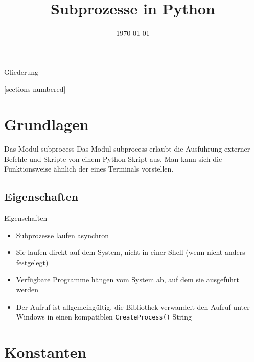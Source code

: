



\title{Subprozesse in Python}
\date{\today}




\maketitle

\begin{frame}{Gliederung}
        \begin{multicols}{2}
                [sections numbered]
                \tableofcontents
        \end{multicols}
\end{frame}


\section{Grundlagen}
\begin{frame}[fragile]{Das Modul subprocess}
	Das Modul \alert{subprocess} erlaubt die Ausf\"uhrung externer Befehle und
	Skripte von einem Python Skript aus. Man kann sich die Funktionsweise \"ahnlich
	der eines Terminals vorstellen.
\end{frame}


\subsection{Eigenschaften}
\begin{frame}[fragile]{Eigenschaften}
	\begin{itemize}
		\item Subprozesse laufen \alert{asynchron}
		\item Sie laufen direkt auf dem System, nicht in einer Shell
		(wenn nicht anders festgelegt)
		\item Verf\"ugbare Programme h\"angen vom System ab, auf dem sie ausgef\"uhrt werden
		\item Der Aufruf ist allgemeing\"ultig, die Bibliothek verwandelt den
		Aufruf unter Windows in einen kompatiblen \texttt{CreateProcess()} String
	\end{itemize}
\end{frame}


\section{Konstanten}
